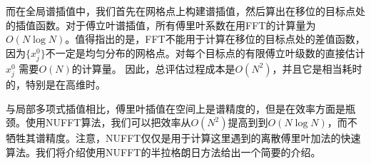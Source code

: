 而在全局谱插值中，我们首先在网格点上构建谱插值，然后算出在移位的目标点处的插值函数。对于傅立叶谱插值，所有傅里叶系数在用FFT的计算量为$O(N\log N)$。值得指出的是，FFT不能用于计算在移位的目标点处的差值函数，因为$\{x^0_j\}$不一定是均匀分布的网格点。对每个目标点的有限傅立叶级数的直接估计$x_j^0$ 需要$O(N)$的计算量。
因此，总评估过程成本是$O(N^2)$，并且它是相当耗时的，特别是在高维时。

与局部多项式插值相比，傅里叶插值在空间上是谱精度的，但是在效率方面是瓶颈。使用NUFFT算法，我们可以把效率从$O(N^2)$提高到到$O(N\log N)$，而不牺牲其谱精度。注意，NUFFT仅仅是用于计算这里遇到的离散傅里叶加法的快速算法。我们将介绍使用NUFFT的半拉格朗日方法给出一个简要的介绍。


